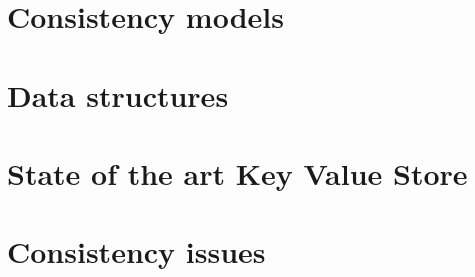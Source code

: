 
\section{Consistency models}

\section{Data structures}

\section*{State of the art Key Value Store}

\section{Consistency issues}








